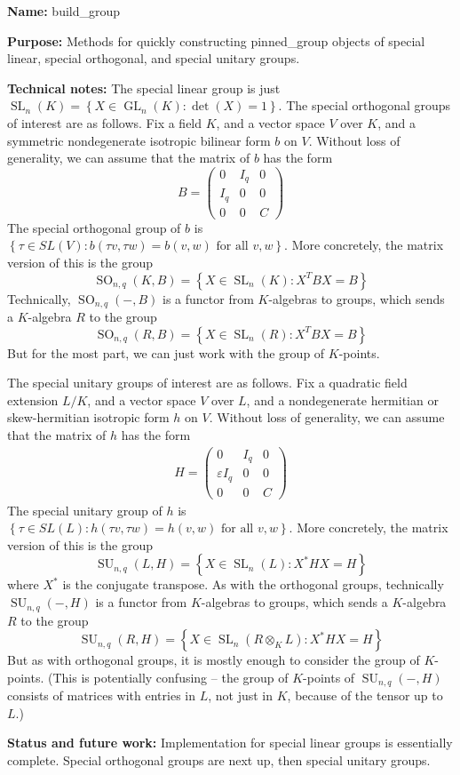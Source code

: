 \documentclass[12pt]{article}
\newcommand{\eps}{\varepsilon}
\newcommand{\lb}{\left\{}
\newcommand{\rb}{\right\}}
\newcommand{\tbf}{\textbf}
\DeclareMathOperator{\SL}{SL}
\DeclareMathOperator{\GL}{GL}
\DeclareMathOperator{\SO}{SO}
\DeclareMathOperator{\SU}{SU}
\begin{document}
\begin{mdframed}[linecolor=red]
\tbf{Name:} build\_group

\smallskip

\tbf{Purpose:} Methods for quickly constructing pinned\_group objects of special linear, special orthogonal, and special unitary groups.

\smallskip

\tbf{Technical notes:} The special linear group is just $\SL_n(K) = \lb X \in \GL_n(K) : \det(X) = 1 \rb$. The special orthogonal groups of interest are as follows. Fix a field $K$, and a vector space $V$ over $K$, and a symmetric nondegenerate isotropic bilinear form $b$ on $V$. Without loss of generality, we can assume that the matrix of $b$ has the form
\[
	B = \begin{pmatrix}
		0 & I_q & 0 \\
		I_q & 0 & 0 \\
		0 & 0 & C
	\end{pmatrix}
\]
The special orthogonal group of $b$ is $\lb \tau \in SL(V) : b(\tau v, \tau w) = b(v, w) \text{ for all } v,w \rb$. More concretely, the matrix version of this is the group
\[
	\SO_{n,q}(K,B) = \lb X \in \SL_n(K) : X^T B X = B \rb
\]
Technically, $\SO_{n,q}(-,B)$ is a functor from $K$-algebras to groups, which sends a $K$-algebra $R$ to the group
\[
	\SO_{n,q}(R,B) = \lb X \in \SL_n(R) : X^T B X = B \rb
\]
But for the most part, we can just work with the group of $K$-points. 

The special unitary groups of interest are as follows. Fix a quadratic field extension $L/K$, and a vector space $V$ over $L$, and a nondegenerate hermitian or skew-hermitian isotropic form $h$ on $V$. Without loss of generality, we can assume that the matrix of $h$ has the form
\begin{align*}
	H = \begin{pmatrix}
		0 & I_q & 0 \\
		\eps I_q & 0 & 0 \\
		0 & 0 & C
	\end{pmatrix}
\end{align*}
The special unitary group of $h$ is $\lb \tau \in SL(L) : h(\tau v, \tau w) = h(v,w) \text{ for all } v,w \rb$. More concretely, the matrix version of this is the group
\[
	\SU_{n,q}(L,H) = \lb X \in \SL_n(L) : X^* H X = H \rb
\]
where $X^*$ is the conjugate transpose. As with the orthogonal groups, technically $\SU_{n,q}(-,H)$ is a functor from $K$-algebras to groups, which sends a $K$-algebra $R$ to the group
\[
	\SU_{n,q}(R,H) = \lb X \in \SL_n(R \otimes_K L) : X^* H X = H \rb
\]
But as with orthogonal groups, it is mostly enough to consider the group of $K$-points. (This is potentially confusing -- the group of $K$-points of $\SU_{n,q}(-,H)$ consists of matrices with entries in $L$, not just in $K$, because of the tensor up to $L$.)

\smallskip

\tbf{Status and future work:} Implementation for special linear groups is essentially complete. Special orthogonal groups are next up, then special unitary groups.
\end{mdframed}
\end{document}
